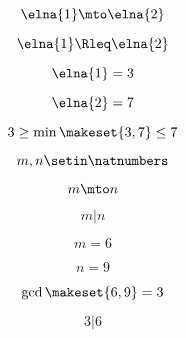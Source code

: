 \begin{forslides}
    \begin{equation}
        \label{eq:feedback-010}
        \elna{1} \mto \elna{2}
    \end{equation}

    \begin{equation}
        \label{eq:feedback-011}
        \elna{1}\Rleq \elna{2}
    \end{equation}

    \begin{equation}
        \label{eq:feedback-012}
        \elna{1} = 3
    \end{equation}

    \begin{equation}
        \label{eq:feedback-013}
        \elna{2} = 7
    \end{equation}

    \begin{equation}
        \label{eq:feedback-014}
        3 \geq \min \makeset{3, 7} \leq 7
    \end{equation}

    \begin{equation}
        \label{eq:feedback-015}
        m, n \setin \natnumbers
    \end{equation}

    \begin{equation}
        \label{eq:feedback-016}
        m \mto n
    \end{equation}

    \begin{equation}
        \label{eq:feedback-017}
        m | n
    \end{equation}

    \begin{equation}
        \label{eq:feedback-018}
        m = 6
    \end{equation}

    \begin{equation}
        \label{eq:feedback-019}
        n = 9
    \end{equation}

    \begin{equation}
        \label{eq:feedback-020}
        \gcd \makeset{6, 9 } = 3
    \end{equation}

    \begin{equation}
        \label{eq:feedback-021}
        3 | 6
    \end{equation}


\end{forslides}
